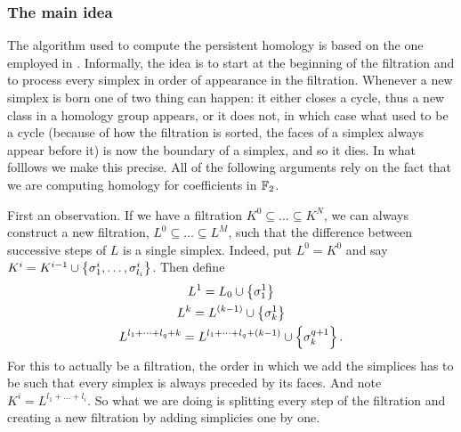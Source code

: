 \documentclass[../main.tex]{subfiles}
\begin{document}
\subsubsection{The main idea}
The algorithm used to compute the persistent homology is based on the one employed in 
\cite{campos}. Informally, the idea is to start at the beginning of the filtration and to
process every simplex in order of appearance in the filtration. Whenever a new simplex is
born one of two thing can happen: it either closes a cycle, thus a new class in a homology
group appears, or it does not, in which case what used to be a cycle (because of how the
filtration is sorted, the faces of a simplex always appear before it) is now the boundary
of a simplex, and so it dies. In what folllows we make this precise. All of the following
arguments rely on the fact that we are computing homology for coefficients in \( \mathbb{F}_2 \).

First an observation. If we have a filtration \( K^0 \subseteq \dots \subseteq K^N \), we
can always construct a new filtration, \( L^0 \subseteq \dots \subseteq L^M \), such that
the difference between successive steps of \( L \) is a single simplex. Indeed, put \( L^0
= K^0 \) and say \( K^i = K^{i-1} \cup \left\{ \sigma^i_1, \dots, \sigma^i_{l_i} \right\} \). Then define
\begin{gather*}
	L^1 = L_0 \cup \left\{ \sigma_1^1 \right\} \\
	L^{k} = L^{(k-1)} \cup \left\{ \sigma_k^1 \right\} \\
	L^{l_1 + \dots + l_q + k} = L^{l_1 + \dots + l_q + (k-1)} \cup \left\{ \sigma_k^{q+1} \right\}.
\end{gather*}
For this to actually be a filtration, the order in which we add the simplices has to be
such that every simplex is always preceded by its faces. And note \( K^i = L^{l_1 + \dots
+ l_i} \). So what we are doing is splitting every step of the filtration and creating a
new filtration by adding simplicies one by one. 
\end{document}
